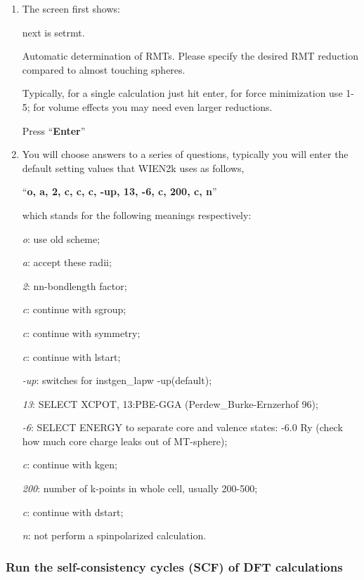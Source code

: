 \documentclass[12 pt]{article}
\begin{document}
  \begin{enumerate}

   \item The screen first shows:

  next is setrmt. 

  Automatic determination of RMTs. Please specify the desired RMT reduction compared to almost touching spheres.

  Typically, for a single calculation just hit enter, for force minimization use 1-5; for volume effects you may 
need even larger reductions. 

  Press ``\textbf{Enter}''

   \item You will choose answers to a series of questions, typically you will enter the default setting values 
that WIEN2k uses as follows,

  ``\textbf{o, a, 2, c, c, c, -up, 13, -6, c, 200, c, n}''

  which stands for the following meanings respectively:

  \emph{o}: use old scheme; 

  \emph{a}: accept these radii; 

  \emph{2}: nn-bondlength factor;

  \emph{c}: continue with sgroup; 

  \emph{c}: continue with symmetry; 

  \emph{c}: continue with lstart; 

  \emph{-up}: switches for instgen\_lapw -up(default); 

  \emph{13}: SELECT XCPOT, 13:PBE-GGA (Perdew\_Burke-Ernzerhof 96); 

  \emph{-6}: SELECT ENERGY to separate core and valence states: -6.0 Ry (check how much core charge leaks out of
 MT-sphere); 

  \emph{c}: continue with kgen; 

  \emph{200}: number of k-points in whole cell, usually 200-500; 

  \emph{c}: continue with dstart; 

  \emph{n}: not perform a spinpolarized calculation. 

  \end{enumerate}

  \cleardoublepage

	\subsubsection{Run the self-consistency cycles (SCF) of DFT calculations}
\end{document}
